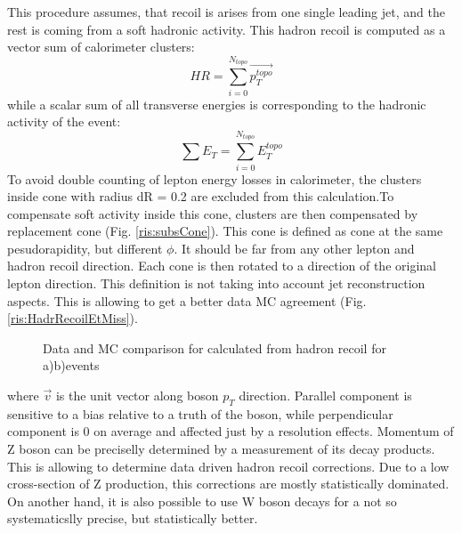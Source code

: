This procedure assumes, that recoil is arises from one single leading jet, and the rest  is coming from a soft hadronic activity. This hadron recoil is computed as a vector sum of calorimeter clusters:
\begin{equation}
HR= \sum_{i=0}^{N_{topo}}\vec{p_T^{topo}}
\end{equation}
while a scalar sum of all transverse energies is corresponding to the hadronic activity of the event:
\begin{equation}\label{eq:sumet}
\sum E_T =\sum_{i=0}^{N_{topo}} E_T^{topo}
\end{equation}
To avoid double counting of lepton energy losses in calorimeter, the clusters inside cone with radius dR = 0.2 are excluded from this calculation.To compensate soft activity inside this cone, clusters are then compensated by replacement cone (Fig. \ref{ris:subsCone}). This cone is defined as cone at the same pesudorapidity, but different $\phi$. It should be far from any other lepton and hadron recoil direction. Each cone is then rotated to a direction of the original lepton direction. This definition is not taking into account jet reconstruction aspects.   This is allowing to get a better data MC agreement (Fig. \ref{ris:HadrRecoilEtMiss}).
\begin{figure}[b]
\begin{minipage}[h]{0.49\linewidth}
\end{minipage}
\hfill
\begin{minipage}[h]{0.49\linewidth}
\end{minipage}
\caption{Data and MC comparison for \etmiss calculated from hadron recoil for a)\wenu b)\wmunu events}
\label{ris:EtMissRefFinal}
\end{figure}



where $\vec{v}$ is the unit vector along boson $p_{T}$ direction. Parallel component is sensitive to a bias relative to a truth \pt of the boson, while perpendicular component is 0 on average and affected just by a resolution effects.  
Momentum of Z boson can be preciselly determined by a measurement of its decay products. This is allowing to determine data driven hadron recoil corrections. Due to a low cross-section of Z production, this corrections are mostly statistically dominated.
On another hand, it is also possible to use W boson decays for a not so systematicslly precise, but statistically better. 


